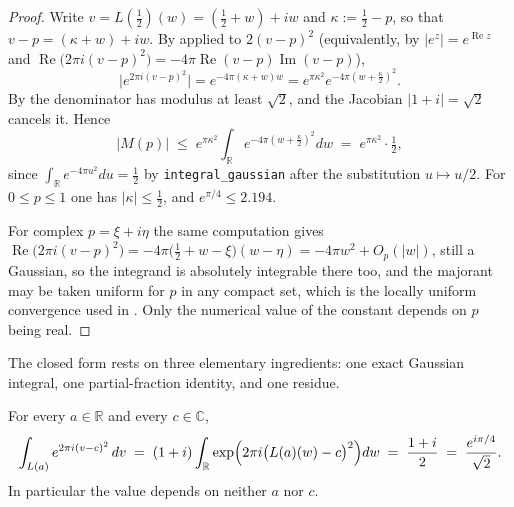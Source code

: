 \begin{proof}
\leanok
{}
Write $v=L(\tfrac12)(w)=(\tfrac12+w)+iw$ and $\kappa:=\tfrac12-p$, so that
$v-p=(\kappa+w)+iw$.  By  applied to $2(v-p)^{2}$ (equivalently,
by $\lvert e^{z}\rvert=e^{\operatorname{Re}z}$ and
$\operatorname{Re}\bigl(2\pi i(v-p)^{2}\bigr)=-4\pi\operatorname{Re}(v-p)\operatorname{Im}(v-p)$),
\[
  \bigl\lvert e^{2\pi i(v-p)^{2}}\bigr\rvert=e^{-4\pi(\kappa+w)w}
  =e^{\pi\kappa^{2}}e^{-4\pi\left(w+\frac\kappa2\right)^{2}} .
\]
By  the denominator has modulus at least $\sqrt2$, and the Jacobian
$\lvert1+i\rvert=\sqrt2$ cancels it.  Hence
\[
  \lvert M(p)\rvert\;\le\;e^{\pi\kappa^{2}}\int_{\mathbb{R}}e^{-4\pi\left(w+\frac\kappa2\right)^{2}}dw
  \;=\;e^{\pi\kappa^{2}}\cdot\tfrac12 ,
\]
since $\int_{\mathbb{R}}e^{-4\pi u^{2}}du=\tfrac12$ by \texttt{integral\_gaussian} after the
substitution $u\mapsto u/2$.  For $0\le p\le1$ one has $\lvert\kappa\rvert\le\tfrac12$, and
$e^{\pi/4}\le2.194$.

For complex $p=\xi+i\eta$ the same computation gives
$\operatorname{Re}\bigl(2\pi i(v-p)^{2}\bigr)
 =-4\pi\bigl(\tfrac12+w-\xi\bigr)(w-\eta)=-4\pi w^{2}+O_{p}(\lvert w\rvert)$,
still a Gaussian, so the integrand is absolutely integrable there too, and the majorant may be
taken uniform for $p$ in any compact set, which is the locally uniform convergence used in
.  Only the numerical value of the constant depends on $p$ being real.
\end{proof}

The closed form rests on three elementary ingredients: one exact Gaussian integral, one
partial-fraction identity, and one residue.

\begin{lemma}
\label{lem:rsf_gauss}
\leanok
{}
For every $a\in\mathbb{R}$ and every $c\in\mathbb{C}$,
\[
  \int_{L(a)}e^{2\pi i(v-c)^{2}}\,dv
  \;=\;(1+i)\int_{\mathbb{R}}\exp\Bigl(2\pi i\bigl(L(a)(w)-c\bigr)^{2}\Bigr)dw
  \;=\;\frac{1+i}{2}\;=\;\frac{e^{i\pi/4}}{\sqrt2} .
\]
In particular the value depends on neither $a$ nor $c$.
\end{lemma}

